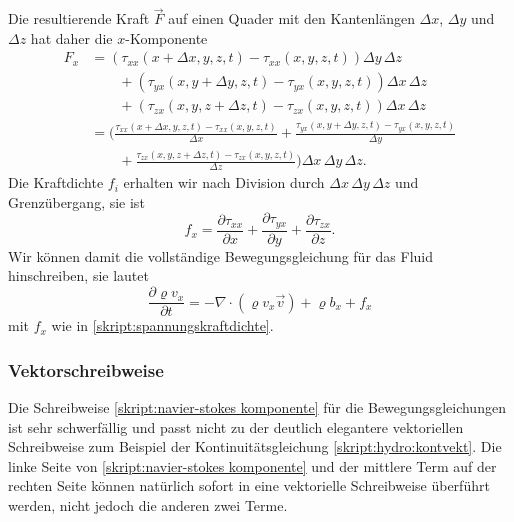 Die resultierende Kraft $\vec{F}$ auf einen Quader mit den Kantenlängen
$\Delta x$, $\Delta y$ und $\Delta z$  hat daher die $x$-Komponente
\begin{align*}
F_x
&=
(
\tau_{xx}(x+\Delta x,y,z,t)
-
\tau_{xx}(x,y,z,t)
) \Delta y\,\Delta z
\\
&\qquad
+
(
\tau_{yx}(x,y+\Delta y,z,t)
-
\tau_{yx}(x,y,z,t)
) \Delta x\,\Delta z
\\
&\qquad
+
(
\tau_{zx}(x,y,z+\Delta z,t)
-
\tau_{zx}(x,y,z,t)
)\Delta x\,\Delta z
\\
&=
\bigg(
\frac{
\tau_{xx}(x+\Delta x,y,z,t)
-
\tau_{xx}(x,y,z,t)
}{\Delta x}
+
\frac{
\tau_{yx}(x,y+\Delta y,z,t)
-
\tau_{yx}(x,y,z,t)
}{\Delta y}
\\
&\qquad
+
\frac{
\tau_{zx}(x,y,z+\Delta z,t)
-
\tau_{zx}(x,y,z,t)
}{\Delta z}
\bigg)
\Delta x\,\Delta y\,\Delta z.
\end{align*}
Die Kraftdichte $f_i$ erhalten wir nach Division durch
$\Delta x\,\Delta y\,\Delta z$ und Grenzübergang, sie ist
\begin{equation}
f_x
=
\frac{\partial \tau_{xx}}{\partial x}
+
\frac{\partial \tau_{yx}}{\partial y}
+
\frac{\partial \tau_{zx}}{\partial z}.
\label{skript:spannungskraftdichte}
\end{equation}
Wir können damit die vollständige Bewegungsgleichung für das Fluid
hinschreiben, sie lautet
\begin{equation}
\frac{\partial \varrho v_x}{\partial t}
=
-\nabla\cdot (\varrho v_x\vec{v})
+
\varrho b_x
+
f_x
\label{skript:navier-stokes komponente}
\end{equation}
mit $f_x$ wie in \eqref{skript:spannungskraftdichte}.

\subsubsection{Vektorschreibweise}
Die Schreibweise
\eqref{skript:navier-stokes komponente}
für die Bewegungsgleichungen ist sehr schwerfällig und passt nicht
zu der deutlich elegantere vektoriellen Schreibweise zum Beispiel
der Kontinuitätsgleichung \eqref{skript:hydro:kontvekt}.
Die linke Seite von
\eqref{skript:navier-stokes komponente}
und der mittlere Term auf der rechten Seite können natürlich sofort
in eine vektorielle Schreibweise überführt werden, nicht jedoch die
anderen zwei Terme.

